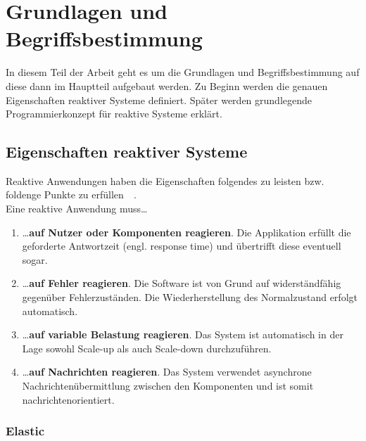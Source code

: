 \chapter{Grundlagen und Begriffsbestimmung}

In diesem Teil der Arbeit geht es um die Grundlagen und Begriffsbestimmung auf diese dann im Hauptteil aufgebaut werden. Zu Beginn werden die genauen Eigenschaften reaktiver Systeme definiert. Später werden grundlegende Programmierkonzept für reaktive Systeme erklärt.

\section{Eigenschaften reaktiver Systeme}

Reaktive Anwendungen haben die Eigenschaften folgendes zu leisten bzw. foldenge Punkte zu erfüllen~\cite[S.~19ff]{kuhn_reactive_2015}~\cite[S.~6]{vernon_reactive_2016}.\\
Eine reaktive Anwendung muss\ldots

\begin{enumerate}
    \item \ldots \textbf{auf Nutzer oder Komponenten reagieren}. Die Applikation erfüllt die geforderte Antwortzeit (engl. response time) und übertrifft diese eventuell sogar.
    \item \ldots \textbf{auf Fehler reagieren}. Die Software ist von Grund auf widerständfähig gegenüber Fehlerzuständen. Die Wiederherstellung des Normalzustand erfolgt automatisch.
    \item \ldots \textbf{auf variable Belastung reagieren}. Das System ist automatisch in der Lage sowohl Scale-up als auch Scale-down durchzuführen.
    \item \ldots \textbf{auf Nachrichten reagieren}. Das System verwendet asynchrone Nachrichtenübermittlung zwischen den Komponenten und ist somit nachrichtenorientiert.
\end{enumerate}

\pagebreak

\subsection{Elastic}\label{subsec:elastic}

